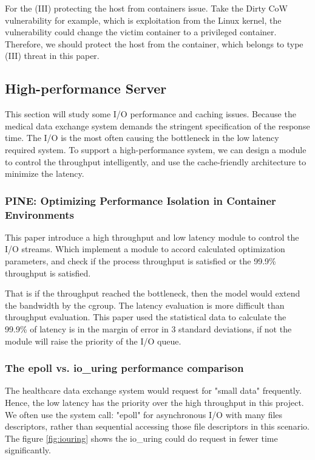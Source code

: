 \documentclass[12pt,a4paper]{article}
\begin{document}
For the (\RN{3}) protecting the host from containers issue.
Take the Dirty CoW vulnerability for example, which is exploitation from the Linux kernel,
the vulnerability could change the victim container to a privileged container. Therefore, we should
protect the host from the container, which belongs to type (\RN{3}) threat in this paper.

\subsection{High-performance Server}
\hypertarget{heigh_performance}{}
This section will study some I/O performance and caching issues. Because the medical
data exchange system demands the stringent specification of the response time.
The I/O is the most often causing the bottleneck in the low latency required system.
To support a high-performance system, we can design a module to control the throughput
intelligently, and use the cache-friendly architecture to minimize the latency.

\subsubsection{PINE: Optimizing Performance Isolation in Container Environments}
This paper \cite{Optimizing} introduce a high throughput and low latency module to control
the I/O streams. Which implement a module to accord calculated optimization parameters,
and check if the process throughput is satisfied or the 99.9\% throughput is satisfied.

That is if the throughput reached the bottleneck, then the model would extend the
bandwidth by the cgroup. The latency evaluation is more difficult than throughput
evaluation. This paper \cite{Optimizing} used the statistical data to calculate the
99.9\% of latency is in the margin of error in 3 standard deviations, if not the
module will raise the priority of the I/O queue.

\subsubsection{The epoll vs. io\_uring performance comparison}
The healthcare data exchange system would request for "small data" frequently.
Hence, the low latency has the priority over the high throughput in this project.
We often use the system call: "epoll" for asynchronous I/O with many files
descriptors, rather than sequential accessing those file descriptors in this scenario.
The figure \ref*{fig:iouring} \cite{epoll_vs_iouring} shows the io\_uring could do request in fewer time
significantly.
\end{document}
